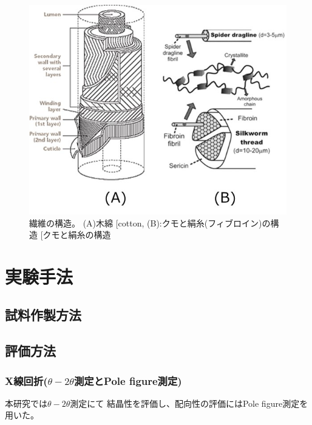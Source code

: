 \documentclass[dvipdfmx,12pt,a4paper]{jreport}
\makeatletter
\DeclareRobustCommand\cite{\unskip
    	\@ifnextchar[{\@tempswatrue\@citex}{\@tempswafalse\@citex[]}}
\makeatother
\begin{document}
			\begin{figure}[h]
				\centering
				\includegraphics[scale=0.8]{fiber_structures.jpg}
				\caption{繊維の構造。 
				(A)木綿\cite{cotton}, 
				(B):クモと絹糸(フィブロイン)の構造\cite{クモと絹糸の構造}}
			\end{figure}
	\chapter{実験手法}
		\section{試料作製方法}
		\newpage
		\section{評価方法}
			\subsection{X線回折($\theta - 2\theta$測定とPole figure測定)}
			本研究では$\theta-2\theta$測定にて
			結晶性を評価し、配向性の評価にはPole figure測定を用いた。
\end{document}

